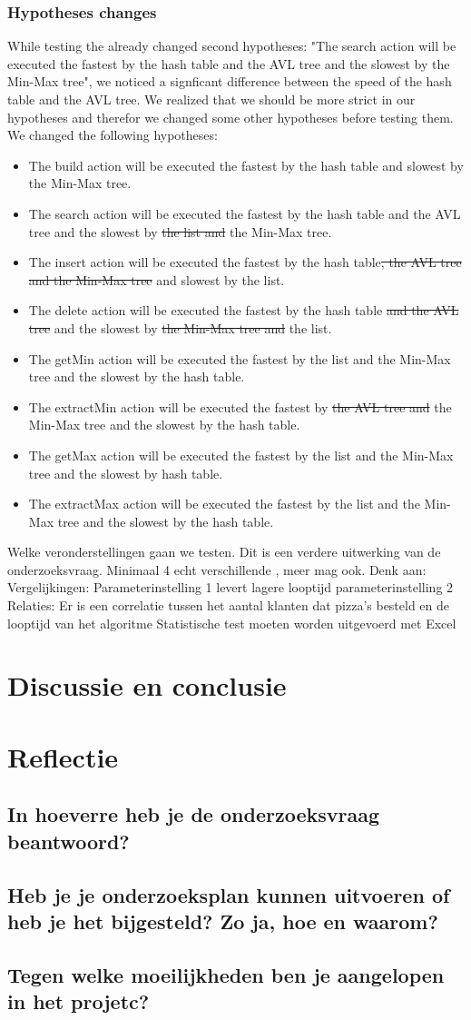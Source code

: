 \documentclass{article}
\begin{document}
\subsubsection{Hypotheses changes}
While testing the already changed second hypotheses: "The search action will be executed the fastest by the hash table and the AVL tree and the slowest by the Min-Max tree", we noticed a signficant difference between the speed of the hash table and the AVL tree. We realized that we should be more strict in our hypotheses and therefor we changed some other hypotheses before testing them. We changed the following hypotheses: 
\begin{itemize}
\item The build action will be executed the fastest by the hash table and slowest by the Min-Max tree.
\item The search action will be executed the fastest by the hash table and the AVL tree and the slowest by\sout{ the  list and }the Min-Max tree.
\item The insert action will be executed the fastest by the hash table\sout{, the AVL tree and the Min-Max tree} and slowest by the list.
\item The delete action will be executed the fastest by the hash table \sout{and the AVL tree} and the slowest by \sout{the Min-Max tree and} the list.
\item The getMin action will be executed the fastest by the list and the Min-Max tree and the slowest by the hash table.
\item The extractMin action will be executed the fastest by  \sout{the AVL tree and} the  Min-Max tree and the slowest by the hash table.
\item The getMax action will be executed the fastest by the list and the Min-Max tree and the slowest by hash table.
\item The extractMax action will be executed the fastest by the list and the Min-Max tree and the slowest by the hash table.



\end{itemize}
 Welke veronderstellingen gaan we testen. Dit is een verdere uitwerking van de onderzoeksvraag. Minimaal 4 echt verschillende , meer mag ook. Denk aan:
Vergelijkingen: Parameterinstelling 1 levert lagere looptijd parameterinstelling 2 Relaties: Er is een correlatie tussen het aantal klanten dat pizza's besteld en de looptijd van het algoritme
Statistische test moeten worden uitgevoerd met Excel
\section{Discussie en conclusie}
\section{Reflectie}
\subsection{In hoeverre heb je de onderzoeksvraag beantwoord?}
\subsection{Heb je je onderzoeksplan kunnen uitvoeren of heb je het bijgesteld? Zo ja, hoe en waarom?}
\subsection{Tegen welke moeilijkheden ben je aangelopen in het projetc?}
\end{document}
